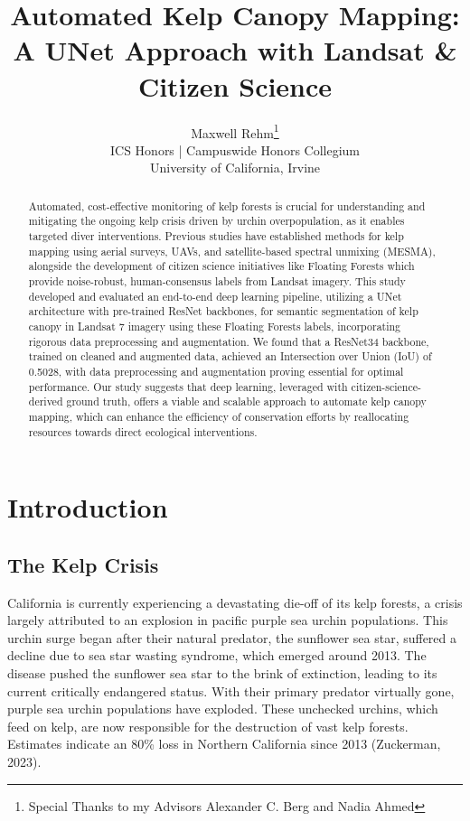 \documentclass{article}
\title{Automated Kelp Canopy Mapping: A UNet Approach with Landsat \& Citizen Science}
\author{%
  Maxwell Rehm\thanks{Special Thanks to my Advisors Alexander C. Berg and Nadia Ahmed} \\
  ICS Honors | Campuswide Honors Collegium \\
  University of California, Irvine\\
}
\begin{document}
\maketitle


\begin{abstract}
  Automated, cost-effective monitoring of kelp forests is crucial for understanding and mitigating the ongoing kelp crisis driven by urchin overpopulation, as it enables targeted diver interventions. Previous studies have established methods for kelp mapping using aerial surveys, UAVs, and satellite-based spectral unmixing (MESMA), alongside the development of citizen science initiatives like Floating Forests which provide noise-robust, human-consensus labels from Landsat imagery. This study developed and evaluated an end-to-end deep learning pipeline, utilizing a UNet architecture with pre-trained ResNet backbones, for semantic segmentation of kelp canopy in Landsat 7 imagery using these Floating Forests labels, incorporating rigorous data preprocessing and augmentation. We found that a ResNet34 backbone, trained on cleaned and augmented data, achieved an Intersection over Union (IoU) of 0.5028, with data preprocessing and augmentation proving essential for optimal performance. Our study suggests that deep learning, leveraged with citizen-science-derived ground truth, offers a viable and scalable approach to automate kelp canopy mapping, which can enhance the efficiency of conservation efforts by reallocating resources towards direct ecological interventions.
\end{abstract}


\section{Introduction}

\subsection{The Kelp Crisis}

California is currently experiencing a devastating die-off of its kelp forests, a crisis largely attributed to an explosion in pacific purple sea urchin populations. This urchin surge began after their natural predator, the sunflower sea star, suffered a decline due to sea star wasting syndrome, which emerged around 2013. The disease pushed the sunflower sea star to the brink of extinction, leading to its current critically endangered status. With their primary predator virtually gone, purple sea urchin populations have exploded. These unchecked urchins, which feed on kelp, are now responsible for the destruction of vast kelp forests. Estimates indicate an 80\% loss in Northern California since 2013 (Zuckerman, 2023).
\end{document}
